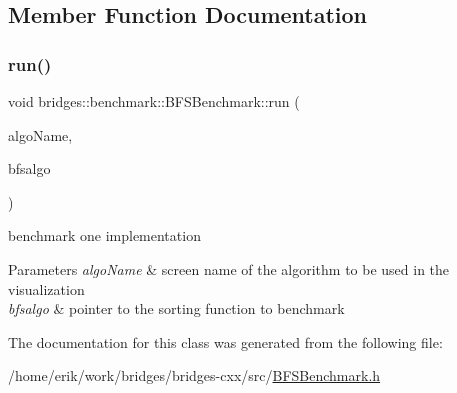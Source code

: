 \subsection{Member Function Documentation}
\mbox{\label{classbridges_1_1benchmark_1_1_b_f_s_benchmark_a8ac66a16c89ecc01b43dc88f9246885c}} 
\subsubsection{\texorpdfstring{run()}{run()}}
{\footnotesize\ttfamily void bridges\+::benchmark\+::\+B\+F\+S\+Benchmark\+::run (\begin{DoxyParamCaption}\item[{std\+::string}]{algo\+Name,  }\item[{void($\ast$)(const \hyperlink{classbridges_1_1datastructure_1_1_graph_adj_list}{Graph\+Adj\+List}$<$ std\+::string $>$ \&gr, std\+::string root, std\+::unordered\+\_\+map$<$ std\+::string, int $>$ \&level, std\+::unordered\+\_\+map$<$ std\+::string, std\+::string $>$ \&parent)}]{bfsalgo }\end{DoxyParamCaption})\hspace{0.3cm}{\ttfamily [inline]}}



benchmark one implementation 


\begin{DoxyParams}{Parameters}
{\em algo\+Name} & screen name of the algorithm to be used in the visualization \\
\hline
{\em bfsalgo} & pointer to the sorting function to benchmark \\
\hline
\end{DoxyParams}


The documentation for this class was generated from the following file\+:\begin{DoxyCompactItemize}
\item 
/home/erik/work/bridges/bridges-\/cxx/src/\hyperlink{_b_f_s_benchmark_8h}{B\+F\+S\+Benchmark.\+h}\end{DoxyCompactItemize}
